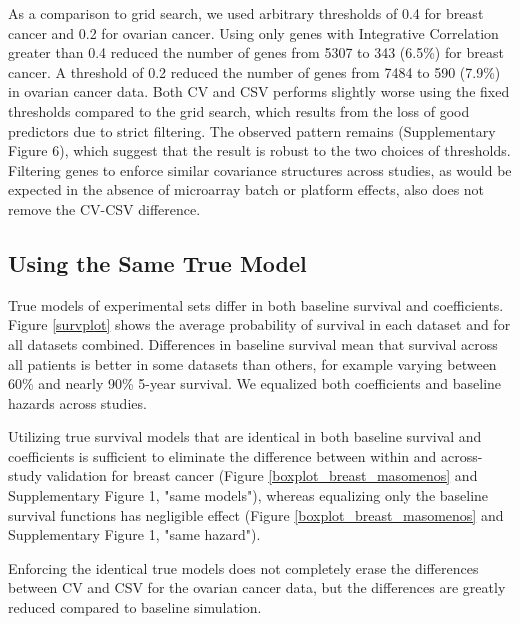 \documentclass{bioinfo}
\begin{document}
  As a comparison to grid search, we used arbitrary thresholds of 0.4 for breast cancer and 0.2 for ovarian cancer. Using only genes with Integrative Correlation greater than 0.4 reduced the number of genes from 5307 to 343 (6.5\%) for breast cancer. A threshold of 0.2 reduced the number of genes 
  from 7484 to 590 (7.9\%) in ovarian cancer data. Both CV and CSV performs slightly worse using the fixed thresholds compared to the grid search, which results from the loss of good predictors due to strict filtering. The observed pattern remains (Supplementary Figure 6), which suggest that the result is robust to the two choices of thresholds. Filtering genes to enforce similar
  covariance structures across studies, as would be expected in the
  absence of microarray batch or platform effects, also does not
  remove the CV-CSV difference.
  

  \subsection{Using the Same True Model}

  True models of experimental sets differ in both baseline survival and
  coefficients. Figure \ref{survplot} shows the average probability of
  survival in each dataset and for all datasets combined. Differences
  in baseline survival mean that survival across all patients is better in some
  datasets than others, for example varying between 60\% and nearly 90\% 5-year
  survival. We equalized both coefficients and baseline hazards across studies.

  Utilizing true survival models that are identical in both
  baseline survival and coefficients is sufficient to eliminate the
  difference between within and across-study validation for breast cancer
  (Figure \ref{boxplot_breast_masomenos} and Supplementary Figure 1, "same models"), whereas
  equalizing only the baseline survival functions has negligible effect
  (Figure \ref{boxplot_breast_masomenos} and Supplementary Figure 1, "same hazard").   
  
  Enforcing the identical true models does not completely erase the differences between CV
  and CSV for the ovarian cancer data, but the differences are greatly reduced 
  compared to baseline simulation.
  
\end{document}
